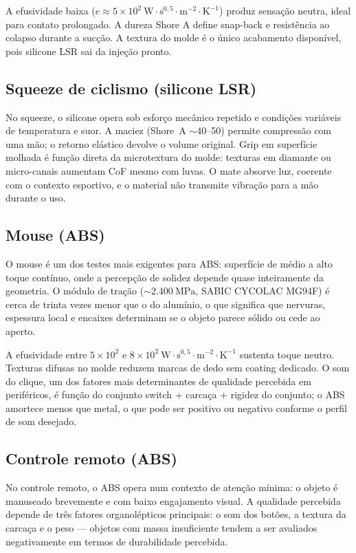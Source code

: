 \documentclass[
  12pt,
  a4paper,
  oneside,
  brazil,
  chapter=TITLE
]{article}
\begin{document}
A efusividade baixa
($e \approx 5 \times 10^{2}\ \mathrm{W \cdot s^{0{,}5} \cdot m^{-2} \cdot K^{-1}}$)
produz sensação neutra, ideal para contato prolongado. A dureza Shore A define snap-back e
resistência ao colapso durante a sucção. A textura do molde é o único acabamento disponível,
pois silicone LSR sai da injeção pronto.

\subsection{Squeeze de ciclismo (silicone LSR)}

No squeeze, o silicone opera sob esforço mecânico repetido e condições variáveis de
temperatura e suor. A maciez (Shore~A ${\sim}$40--50) permite compressão com uma mão;
o retorno elástico devolve o volume original. Grip em superfície molhada é função direta
da microtextura do molde: texturas em diamante ou micro-canais aumentam CoF mesmo com
luvas. O mate absorve luz, coerente com o contexto esportivo, e o material não transmite
vibração para a mão durante o uso.

\subsection{Mouse (ABS)}

O mouse é um dos testes mais exigentes para ABS: superfície de médio a alto toque
contínuo, onde a percepção de solidez depende quase inteiramente da geometria. O módulo
de tração (${\sim}2.400\ \mathrm{MPa}$, SABIC CYCOLAC MG94F) é cerca de trinta vezes
menor que o do alumínio, o que significa que nervuras, espessura local e encaixes
determinam se o objeto parece sólido ou cede ao aperto.

A efusividade entre $5 \times 10^{2}$ e $8 \times 10^{2}\ \mathrm{W \cdot s^{0{,}5}
\cdot m^{-2} \cdot K^{-1}}$ sustenta toque neutro. Texturas difusas no molde reduzem
marcas de dedo sem coating dedicado. O som do clique, um dos fatores mais determinantes
de qualidade percebida em periféricos, é função do conjunto switch + carcaça + rigidez
do conjunto; o ABS amortece menos que metal, o que pode ser positivo ou negativo conforme
o perfil de som desejado.

\subsection{Controle remoto (ABS)}

No controle remoto, o ABS opera num contexto de atenção mínima: o objeto é manuseado
brevemente e com baixo engajamento visual. A qualidade percebida depende de três fatores
organolépticos principais: o som dos botões, a textura da carcaça e o peso --- objetos
com massa insuficiente tendem a ser avaliados negativamente em termos de durabilidade
percebida.
\end{document}
